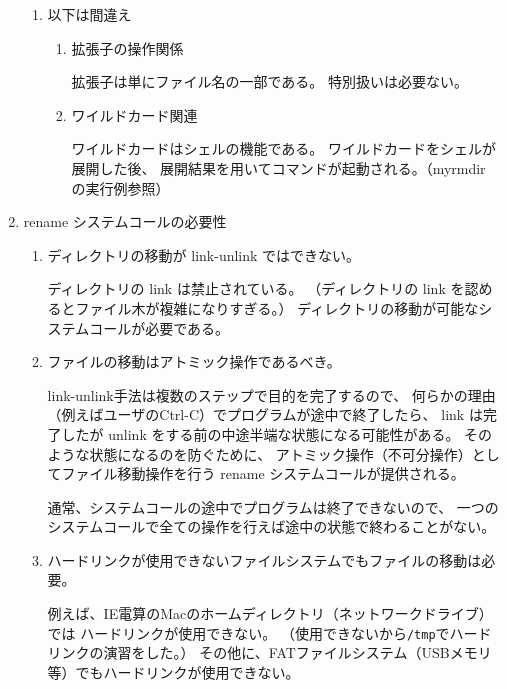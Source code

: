 \documentclass[a4j,twcolumn,11pt,nomag]{ltjarticle}      %
\begin{document}
\begin{enumerate}
\begin{enumerate}
\item 以下は間違え

\begin{enumerate}
\item 拡張子の操作関係

拡張子は単にファイル名の一部である。
特別扱いは必要ない。

\item ワイルドカード関連

ワイルドカードはシェルの機能である。
ワイルドカードをシェルが展開した後、
展開結果を用いてコマンドが起動される。（myrmdir の実行例参照）

\end{enumerate}
\end{enumerate}

\item rename システムコールの必要性

\begin{enumerate}
\item ディレクトリの移動が link-unlink ではできない。

ディレクトリの link は禁止されている。
（ディレクトリの link を認めるとファイル木が複雑になりすぎる。）
ディレクトリの移動が可能なシステムコールが必要である。

\item ファイルの移動はアトミック操作であるべき。

link-unlink手法は複数のステップで目的を完了するので、
何らかの理由（例えばユーザのCtrl-C）でプログラムが途中で終了したら、
link は完了したが unlink をする前の中途半端な状態になる可能性がある。
そのような状態になるのを防ぐために、
アトミック操作（不可分操作）としてファイル移動操作を行う
rename システムコールが提供される。

通常、システムコールの途中でプログラムは終了できないので、
一つのシステムコールで全ての操作を行えば途中の状態で終わることがない。

\item ハードリンクが使用できないファイルシステムでもファイルの移動は必要。

例えば、IE電算のMacのホームディレクトリ（ネットワークドライブ）では
ハードリンクが使用できない。
（使用できないから\texttt{/tmp}でハードリンクの演習をした。）
その他に、FATファイルシステム（USBメモリ等）でもハードリンクが使用できない。


\end{enumerate}
\end{enumerate}
\end{document}
